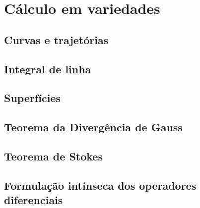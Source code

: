 \documentclass[12pt]{book}
\begin{document}

\part{Cálculo em variedades}

\chapter{Curvas e trajetórias}
\chapter{Integral de linha}
\chapter{Superfícies}
\chapter{Teorema da Divergência de Gauss}
\chapter{Teorema de Stokes}
\chapter{Formulação intínseca dos operadores diferenciais}
















\backmatter





\printindex
\end{document}
